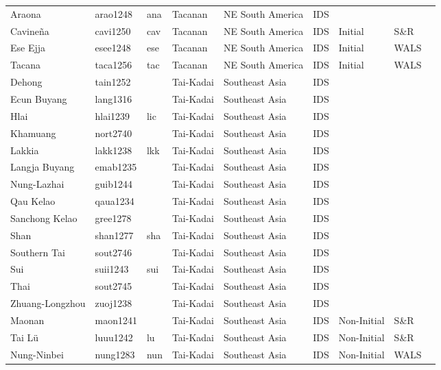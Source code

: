 \begin{longtable}{lllllllll}
  Araona & arao1248 & ana & Tacanan & NE South America & IDS &  &  &  \\ 
  Cavineña & cavi1250 & cav & Tacanan & NE South America & IDS & Initial & S\&R & \cite[102]{guillaume_cavinena2008v3}\cite[599]{15_Pronouns.pdf} \\ 
  Ese Ejja & esee1248 & ese & Tacanan & NE South America & IDS & Initial & WALS &  \\ 
  Tacana & taca1256 & tac & Tacanan & NE South America & IDS & Initial & WALS &  \\ 
  Dehong & tain1252 &  & Tai-Kadai & Southeast Asia & IDS &  &  &  \\ 
  Ecun Buyang & lang1316 &  & Tai-Kadai & Southeast Asia & IDS &  &  &  \\ 
  Hlai  & hlai1239 & lic & Tai-Kadai & Southeast Asia & IDS &  &  &  \\ 
  Khamuang  & nort2740 &  & Tai-Kadai & Southeast Asia & IDS &  &  &  \\ 
  Lakkia & lakk1238 & lkk & Tai-Kadai & Southeast Asia & IDS &  &  &  \\ 
  Langja Buyang & emab1235 &  & Tai-Kadai & Southeast Asia & IDS &  &  &  \\ 
  Nung-Lazhai & guib1244 &  & Tai-Kadai & Southeast Asia & IDS &  &  &  \\ 
  Qau Kelao & qaua1234 &  & Tai-Kadai & Southeast Asia & IDS &  &  &  \\ 
  Sanchong Kelao & gree1278 &  & Tai-Kadai & Southeast Asia & IDS &  &  &  \\ 
  Shan  & shan1277 & sha & Tai-Kadai & Southeast Asia & IDS &  &  &  \\ 
  Southern Tai  & sout2746 &  & Tai-Kadai & Southeast Asia & IDS &  &  &  \\ 
  Sui & suii1243 & sui & Tai-Kadai & Southeast Asia & IDS &  &  &  \\ 
  Thai  & sout2745 &  & Tai-Kadai & Southeast Asia & IDS &  &  &  \\ 
  Zhuang-Longzhou & zuoj1238 &  & Tai-Kadai & Southeast Asia & IDS &  &  &  \\ 
  Maonan & maon1241 &  & Tai-Kadai & Southeast Asia & IDS & Non-Initial & S\&R & \cite[178]{lu_maonan2008} \\ 
  Tai Lü & luuu1242 & lu & Tai-Kadai & Southeast Asia & IDS & Non-Initial & S\&R & \cite[48]{hartmann_tai-lue1984.pdf} \\ 
  Nung-Ninbei & nung1283 & nun & Tai-Kadai & Southeast Asia & IDS & Non-Initial & WALS &  \\ 

\end{longtable}
